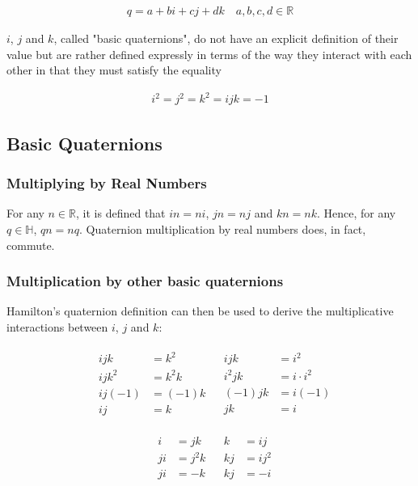 \documentclass[12pt, a4paper]{article}
\begin{document}
\begin{align*}
    q = a + bi + cj + dk \quad a, b, c, d \in \mathbb{R}
\end{align*}

$i$, $j$ and $k$, called "basic quaternions", do not have an explicit definition
of their value but are rather defined expressly in terms of the way they
interact with each other in that they must satisfy the equality

\begin{align*}
    i^2 = j^2 = k^2 = ijk = -1
\end{align*}

\subsection{Basic Quaternions}

\subsubsection{Multiplying by Real Numbers}
For any $n \in \mathbb{R}$, it is defined that $in = ni$, $jn = nj$ and $kn =
    nk$. Hence, for any $q \in \mathbb{H}$, $qn = nq$. Quaternion multiplication by
real numbers does, in fact, commute.

\subsubsection{Multiplication by other basic quaternions}
Hamilton's quaternion definition can then be used to derive the multiplicative
interactions between $i$, $j$ and $k$:

\begin{align*}
     &
    \begin{aligned}
        ijk    & = k^2   \\
        ijk^2  & = k^2k  \\
        ij(-1) & = (-1)k \\
        ij     & = k
    \end{aligned}
     &
    \begin{aligned}
        ijk    & = i^2         \\
        i^2 jk & = i \cdot i^2 \\
        (-1)jk & = i(-1)       \\
        jk     & = i
    \end{aligned}
\end{align*}

\begin{align*}
     &
    \begin{aligned}
        i  & = jk   \\
        ji & = j^2k \\
        ji & = -k
    \end{aligned}
     &
    \begin{aligned}
        k  & = ij   \\
        kj & = ij^2 \\
        kj & = -i
    \end{aligned}
\end{align*}
\end{document}

